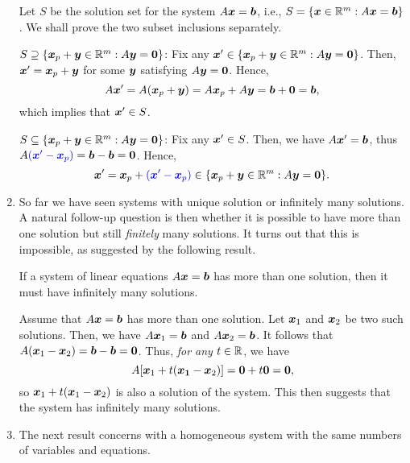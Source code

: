 \begin{enumerate}
\begin{pf}
Let \(S\) be the solution set for the system \(A\vb*{x}=\vb*{b}\), i.e.,
\(S=\{\vb*{x}\in\mathbb{R}^m:A\vb*{x}=\vb*{b}\}\). We shall prove the two subset
inclusions separately.

\underline{\(S\supseteq \{\vb*{x}_p+\vb*{y}\in\mathbb{R}^m:A\vb*{y}=\vb*{0}\}\)}:
Fix any \(\vb*{x}'\in\{\vb*{x}_p+\vb*{y}\in\mathbb{R}^m:A\vb*{y}=\vb*{0}\}\). Then,
\(\vb*{x}'=\vb*{x}_p+\vb*{y}\) for some \(\vb*{y}\) satisfying
\(A\vb*{y}=\vb*{0}\). Hence,
\[
A\vb*{x}'=A(\vb*{x}_p+\vb*{y})=A\vb*{x}_p+A\vb*{y}=\vb*{b}+\vb*{0}=\vb*{b},
\]
which implies that \(\vb*{x}'\in S\).

\underline{\(S\subseteq \{\vb*{x}_p+\vb*{y}\in\mathbb{R}^m:A\vb*{y}=\vb*{0}\}\)}:
Fix any \(\vb*{x}'\in S\). Then, we have \(A\vb*{x}'=\vb*{b}\), thus
\(A{\color{blue}(\vb*{x}'-\vb*{x}_p)}=\vb*{b}-\vb*{b}=\vb*{0}\). Hence,
\[
\vb*{x}'=\vb*{x}_p+{\color{blue}(\vb*{x}'-\vb*{x}_p)}
\in\{\vb*{x}_p+\vb*{y}\in\mathbb{R}^m:A\vb*{y}=\vb*{0}\}.
\]
\end{pf}

\item So far we have seen systems with unique solution or infinitely many
solutions. A natural follow-up question is then whether it is possible to have
more than one solution but still \emph{finitely} many solutions. It turns out
that this is impossible, as suggested by the following result.

\begin{proposition}
\label{prp:sle-more-than-one-sol-inf}
If a system of linear equations \(A\vb*{x}=\vb*{b}\) has more than one
solution, then it must have infinitely many solutions.
\end{proposition}
\begin{pf}
Assume that \(A\vb*{x}=\vb*{b}\) has more than one solution. Let
\(\vb*{x}_1\) and \(\vb*{x}_2\) be two such solutions. Then, we have
\(A\vb*{x}_1=\vb*{b}\) and \(A\vb*{x}_2=\vb*{b}\). It follows that
\(A(\vb*{x}_1-\vb*{x}_2)=\vb*{b}-\vb*{b}=\vb*{0}\). Thus, \emph{for any}
\(t\in\mathbb{R}\), we have
\[
A[\vb*{x}_1+t(\vb*{x_1}-\vb*{x}_2)]
=\vb*{0}+t\vb*{0}
=\vb*{0},
\]
so \(\vb*{x}_1+t(\vb*{x}_1-\vb*{x}_2)\) is also a solution of the system.
This then suggests that the system has infinitely many solutions.
\end{pf}

\item The next result concerns with a homogeneous system with the same numbers
of variables and equations.


\end{enumerate}
